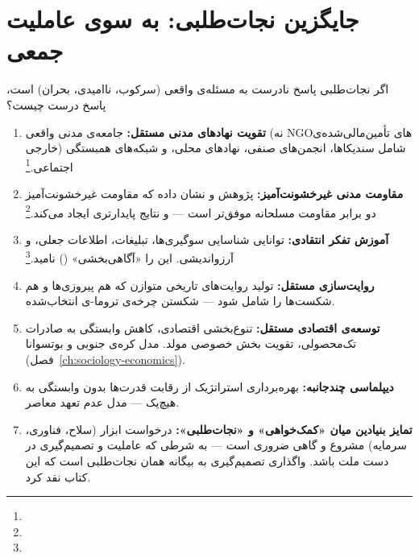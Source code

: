 \section{جایگزین نجات‌طلبی: به سوی عاملیت جمعی}
\label{sec:ch14-alternative}

اگر نجات‌طلبی پاسخ نادرست به مسئله‌ی واقعی (سرکوب، ناامیدی، بحران) است، پاسخ درست چیست؟

\begin{tcolorbox}[successbox, title={هفت ستون عاملیت جمعی: جایگزین نجات‌طلبی}]
\begin{enumerate}
\item \textbf{تقویت نهادهای مدنی مستقل:}
جامعه‌ی مدنی واقعی (نه NGOهای تأمین‌مالی‌شده‌ی خارجی) شامل سندیکاها، انجمن‌های صنفی، نهادهای محلی، و شبکه‌های همبستگی اجتماعی.\footnote{}

\item \textbf{مقاومت مدنی غیرخشونت‌آمیز:}
پژوهش  و  نشان داده که مقاومت غیرخشونت‌آمیز دو برابر مقاومت مسلحانه موفق‌تر است — و نتایج پایدارتری ایجاد می‌کند.\footnote{}

\item \textbf{آموزش تفکر انتقادی:}
توانایی شناسایی سوگیری‌ها، تبلیغات، اطلاعات جعلی، و آرزواندیشی.  این را «آگاهی‌بخشی» () نامید.\footnote{}

\item \textbf{روایت‌سازی مستقل:}
تولید روایت‌های تاریخی متوازن که هم پیروزی‌ها و هم شکست‌ها را شامل شود — شکستن چرخه‌ی تروما-ی انتخاب‌شده.

\item \textbf{توسعه‌ی اقتصادی مستقل:}
تنوع‌بخشی اقتصادی، کاهش وابستگی به صادرات تک‌محصولی، تقویت بخش خصوصی مولد. مدل کره‌ی جنوبی و بوتسوانا (فصل~\ref{ch:sociology-economics}).

\item \textbf{دیپلماسی چندجانبه:}
بهره‌برداری استراتژیک از رقابت قدرت‌ها بدون وابستگی به هیچ‌یک — مدل عدم تعهد معاصر.

\item \textbf{تمایز بنیادین میان «کمک‌خواهی» و «نجات‌طلبی»:}
درخواست ابزار (سلاح، فناوری، سرمایه) مشروع و گاهی ضروری است — به شرطی که عاملیت و تصمیم‌گیری در دست ملت باشد. واگذاری تصمیم‌گیری به بیگانه همان نجات‌طلبی است که این کتاب نقد کرد.
\end{enumerate}
\end{tcolorbox}


